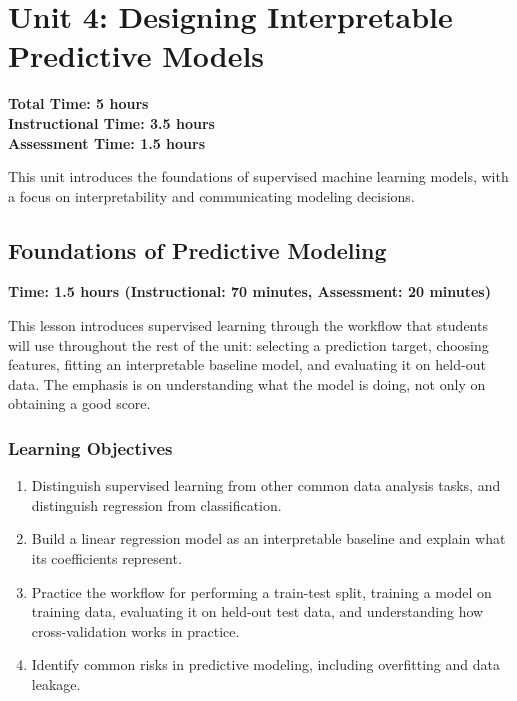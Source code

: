 \chapter{Unit 4: Designing Interpretable Predictive Models}
\label{chap:unit4}

\textbf{Total Time: 5 hours} \\
\textbf{Instructional Time: 3.5 hours} \\
\textbf{Assessment Time: 1.5 hours}

This unit introduces the foundations of supervised machine learning models, with a focus on interpretability and communicating modeling decisions.

\section{Foundations of Predictive Modeling}
\label{sec:4.1}

\textbf{Time: 1.5 hours (Instructional: 70 minutes, Assessment: 20 minutes)}

\noindent This lesson introduces supervised learning through the workflow that students will use throughout the rest of the unit: selecting a prediction target, choosing features, fitting an interpretable baseline model, and evaluating it on held-out data. The emphasis is on understanding what the model is doing, not only on obtaining a good score.

\subsection{Learning Objectives}

\begin{enumerate}
    \item Distinguish supervised learning from other common data analysis tasks, and distinguish regression from classification.
    \item Build a linear regression model as an interpretable baseline and explain what its coefficients represent.
    \item Practice the workflow for performing a train-test split, training a model on training data, evaluating it on held-out test data, and understanding how cross-validation works in practice.
    \item Identify common risks in predictive modeling, including overfitting and data leakage.
\end{enumerate}

